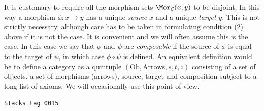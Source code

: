 It is customary to require all the morphism sets
$\Mor_\mathcal{C}(x, y)$ to be disjoint.
In this way a morphism $\phi : x \to y$ has a unique {\it source} $x$
and a unique {\it target} $y$. This is not strictly necessary,
although care has to be taken in formulating condition (2) above
if it is not the case. It is convenient and we will often assume
this is the case. In this case we say that $\phi$ and $\psi$ are
{\it composable} if the source of $\phi$ is equal to the
target of $\psi$, in which case $\phi \circ \psi$ is defined.
An equivalent definition would be to define a category
as a quintuple $(\text{Ob}, \text{Arrows}, s, t, \circ)$
consisting of a set of objects, a set of morphisms (arrows),
source, target and composition subject to a long list of axioms.
We will occasionally use this point of view.

\begin{remark}
\label{categories-remark-big-categories}
\href{https://stacks.math.columbia.edu/tag/0015}{\texttt{Stacks tag 0015}}


\end{remark}
